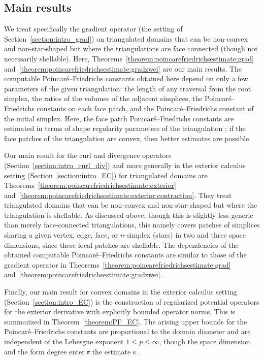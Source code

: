 \documentclass[10pt,letterpaper]{article}
\newcommand\cye[1]{%
  \protect\leavevmode
  \begingroup
    \color{red!35!yellow}%
    #1%
  \endgroup
}
\begin{document}
\subsection{\cye{Main results}}

\cye{We treat specifically the gradient operator (the setting of Section~\ref{section:intro_grad}) on triangulated domains that can be non-convex and non-star-shaped but where the triangulations are face connected (though not necessarily shellable). Here, Theorems~\ref{theorem:poincarefriedrichsestimate:grad} and~\ref{theorem:poincarefriedrichsestimate:gradzwei} are our main results.}  
The computable Poincar\'e--Friedrichs constants obtained here depend on only a few parameters of the \cye{given} triangulation: the length of any traversal from the root simplex, the ratios of the volumes of \cye{the} adjacent simplices, the Poincar\'e--Friedrichs constants on each face patch, and the Poincar\'e--Friedrichs constant of the initial simplex. \cye{Here,} the \cye{face patch} Poincar\'e--Friedrichs constants \cye{are} estimated in terms of shape \cye{regularity parameters of the triangulation}; if the face patches of the triangulation are convex, then better estimates are possible. 

\cye{Our main result for the curl and divergence operators (Section~\ref{section:intro_curl_div}) and more generally in the exterior calculus setting (Section~\ref{section:intro_EC}) for triangulated domains are Theorems~\ref{theorem:poincarefriedrichsestimate:exterior} and~\ref{theorem:poincarefriedrichsestimate:exterior:contraction}.
They treat triangulated domains that can be non-convex and non-star-shaped but where the triangulation is shellable. As discussed above, though this is slightly less generic than merely face-connected triangulations, this namely covers patches of simplices sharing a given vertex, edge, face, or $n$-simplex (stars) in two and three space dimensions, since these local patches are shellable. The dependencies of the obtained computable Poincar\'e--Friedrichs constants are similar to those of the gradient operator in Theorems~\ref{theorem:poincarefriedrichsestimate:grad} and~\ref{theorem:poincarefriedrichsestimate:gradzwei}.}

\cye{Finally, our main result for convex domains in the exterior calculus setting (Section~\ref{section:intro_EC}) is the construction} of regularized potential operators for the exterior derivative with explicitly bounded operator norms. \cye{This is summarized in Theorem~\ref{theorem:PF_EC}.}  \cye{The arising upper bounds for} the Poincar\'e--Friedrichs constants are proportional to the domain diameter and are independent of the Lebesgue exponent $1 \leq p \leq \infty$, though the \cye{space} dimension and the form degree enter\cye{\sout{s}} the estimate\cye{s}. 
\end{document}
